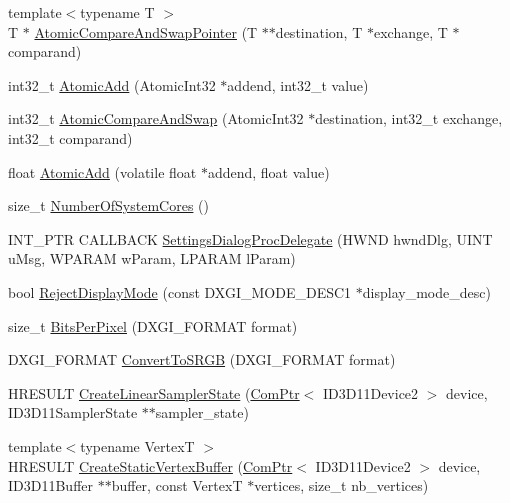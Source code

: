 \begin{DoxyCompactItemize}
\item 
{\footnotesize template$<$typename T $>$ }\\T $\ast$ \hyperlink{namespacemage_aed89242e67231f3ddef77bdc63b32b6c}{Atomic\+Compare\+And\+Swap\+Pointer} (T $\ast$$\ast$destination, T $\ast$exchange, T $\ast$comparand)
\item 
int32\+\_\+t \hyperlink{namespacemage_ad397e742fa7e3532686fd46bb50e8166}{Atomic\+Add} (Atomic\+Int32 $\ast$addend, int32\+\_\+t value)
\item 
int32\+\_\+t \hyperlink{namespacemage_a03da57cfa5ba14d4aa0472ae49ec5c7e}{Atomic\+Compare\+And\+Swap} (Atomic\+Int32 $\ast$destination, int32\+\_\+t exchange, int32\+\_\+t comparand)
\item 
float \hyperlink{namespacemage_a0de5ff6241a0474f4572c7c3ba342098}{Atomic\+Add} (volatile float $\ast$addend, float value)
\item 
size\+\_\+t \hyperlink{namespacemage_afe0cda2eaeef24c7e3ee5d7a739b81e4}{Number\+Of\+System\+Cores} ()
\item 
I\+N\+T\+\_\+\+P\+TR C\+A\+L\+L\+B\+A\+CK \hyperlink{namespacemage_a6b352e8d2bf3eeccf1a5dec3f1cf4130}{Settings\+Dialog\+Proc\+Delegate} (H\+W\+ND hwnd\+Dlg, U\+I\+NT u\+Msg, W\+P\+A\+R\+AM w\+Param, L\+P\+A\+R\+AM l\+Param)
\item 
bool \hyperlink{namespacemage_abdccde1f16aa2239019e1b455d8b941b}{Reject\+Display\+Mode} (const D\+X\+G\+I\+\_\+\+M\+O\+D\+E\+\_\+\+D\+E\+S\+C1 $\ast$display\+\_\+mode\+\_\+desc)
\item 
size\+\_\+t \hyperlink{namespacemage_a782fb3970da2fbbc93627f7324c193aa}{Bits\+Per\+Pixel} (D\+X\+G\+I\+\_\+\+F\+O\+R\+M\+AT format)
\item 
D\+X\+G\+I\+\_\+\+F\+O\+R\+M\+AT \hyperlink{namespacemage_a9d84163ab692956f5f4537a965238a09}{Convert\+To\+S\+R\+GB} (D\+X\+G\+I\+\_\+\+F\+O\+R\+M\+AT format)
\item 
H\+R\+E\+S\+U\+LT \hyperlink{namespacemage_aa74f1b3d53951f4d3f6323a5490ac953}{Create\+Linear\+Sampler\+State} (\hyperlink{namespacemage_ae74f374780900893caa5555d1031fd79}{Com\+Ptr}$<$ I\+D3\+D11\+Device2 $>$ device, I\+D3\+D11\+Sampler\+State $\ast$$\ast$sampler\+\_\+state)
\item 
{\footnotesize template$<$typename VertexT $>$ }\\H\+R\+E\+S\+U\+LT \hyperlink{namespacemage_aa8500c749a1f216d07be3e996ca63b17}{Create\+Static\+Vertex\+Buffer} (\hyperlink{namespacemage_ae74f374780900893caa5555d1031fd79}{Com\+Ptr}$<$ I\+D3\+D11\+Device2 $>$ device, I\+D3\+D11\+Buffer $\ast$$\ast$buffer, const VertexT $\ast$vertices, size\+\_\+t nb\+\_\+vertices)
$$
\end{DoxyCompactItemize}
